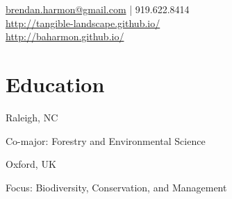 \documentclass[]{baharmon-cv}
\begin{document}
%
%

%
%
{\vspace*{0.1cm} 
\href{mailto:brendan.harmon@gmail.com}{brendan.harmon@gmail.com} | 919.622.8414 \\
\url{http://tangible-landscape.github.io/} \\
\url{http://baharmon.github.io/}\\ 

}
%
%



%
%


\vspace*{0.2cm}
\section{Education} 
\begin{minipage}[t]{0.85\textwidth} 
\end{minipage}
\begin{minipage}[t]{0.15\textwidth} 
Raleigh, NC
\end{minipage}
Co-major: Forestry and Environmental Science
\vspace*{0.1cm}

\begin{minipage}[t]{0.85\textwidth} 
\end{minipage}
\begin{minipage}[t]{0.15\textwidth} 
Oxford, UK
\end{minipage}
Focus: Biodiversity, Conservation, and Management
\vspace*{0.1cm}
\end{document}
